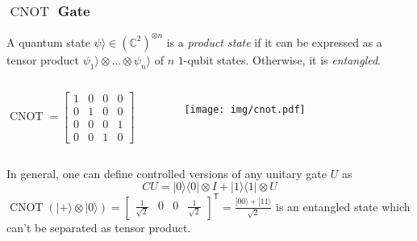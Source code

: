 \documentclass[UTF8,11pt,colorlinks,compress,openany]{beamer}%
\begin{document}
\begin{frame}\frametitle{$\operatorname{CNOT}$ Gate}
\begin{definition}
	A quantum state $\psi\rangle\in(\mathbb{C}^2)^{\otimes n}$ is a \emph{product state} if it can be expressed as a tensor product $\psi_1\rangle \otimes \dots \otimes \psi_n\rangle$ of $n$ $1$-qubit states. Otherwise, it is \emph{entangled}.
\end{definition}
\begin{columns}
\[\operatorname{CNOT}=
\begin{bmatrix}
	1&0&0&0\\
	0&1&0&0\\
	0&0&0&1\\
	0&0&1&0
\end{bmatrix}\]
	\begin{figure}[H]
		\texttt{[image: img/cnot.pdf]}
	\end{figure}
\end{columns}
	In general, one can define controlled versions of any unitary gate $U$ as
		\[CU=|0\rangle\langle 0|\otimes I+|1\rangle\langle 1|\otimes U\]
$\operatorname{CNOT}(|+\rangle\otimes|0\rangle)=
\begin{bmatrix}
	\frac{1}{\sqrt{2}}&0&0&\frac{1}{\sqrt{2}}
\end{bmatrix}^\mathsf{T}=\frac{|00\rangle+|11\rangle}{\sqrt{2}}$ is an entangled state which can't be separated as tensor product.
\end{frame}
\end{document}
